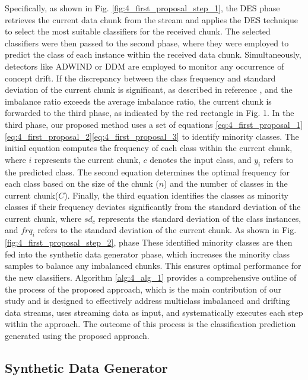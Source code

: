 Specifically, as shown in Fig. \ref{fig:4_first_proposal_step_1}, the DES phase retrieves the current data chunk from the stream and applies the DES technique to select the most suitable classifiers for the received chunk. The selected classifiers were then passed to the second phase, where they were employed to predict the class of each instance within the received data chunk. Simultaneously, detectors like ADWIND or DDM are employed to monitor any occurrence of concept drift. If the discrepancy between the class frequency and standard deviation of the current chunk is significant, as described in reference \cite{gama2004learning}, and the imbalance ratio exceeds the average imbalance ratio, the current chunk is forwarded to the third phase, as indicated by the red rectangle in Fig. 1. In the third phase, our proposed method uses a set of equations 	\ref{eq:4_first_proposal_1}\ref{eq:4_first_proposal_2}\ref{eq:4_first_proposal_3}
to identify minority classes. The initial equation computes the frequency of each class within the current chunk, where $i$ represents the current chunk, $c$ denotes the input class, and $y_i$ refers to the predicted class. The second equation determines the optimal frequency for each class based on the size of the chunk ($n$) and the number of classes in the current chunk($C$). Finally, the third equation identifies the classes as minority classes if their frequency deviates significantly from the standard deviation of the current chunk, where $sd_c$ represents the standard deviation of the class instances, and $frq_i$ refers to the standard deviation of the current chunk.
As shown in Fig. \ref{fig:4_first_proposal_step_2}, phase These identified minority classes are then fed into the synthetic data generator phase, which increases the minority class samples to balance any imbalanced chunks. This ensures optimal performance for the new classifiers. Algorithm  \ref{alg:4_alg_1} provides a comprehensive outline of the process of the proposed approach, which is the main contribution of our study and is designed to effectively address multiclass imbalanced and drifting data streams, uses streaming data as input, and systematically executes each step within the approach. The outcome of this process is the classification prediction generated using the proposed approach.


\subsection{Synthetic Data Generator}

